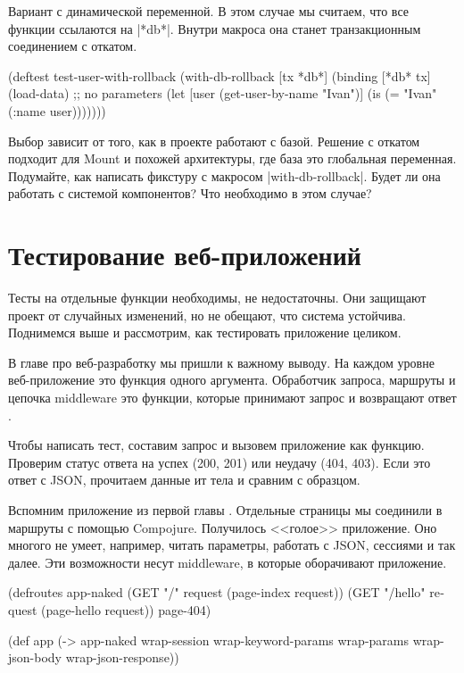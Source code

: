 
Вариант с динамической переменной. В этом случае мы считаем, что все функции
ссылаются на \spverb|*db*|. Внутри макроса она станет транзакционным соединением
с откатом.

\begin{english}
  \begin{clojure}
(deftest test-user-with-rollback
  (with-db-rollback [tx *db*]
    (binding [*db* tx]
      (load-data) ;; no parameters
      (let [user (get-user-by-name "Ivan")]
        (is (= "Ivan" (:name user)))))))
  \end{clojure}
\end{english}

Выбор зависит от того, как в проекте работают с базой. Решение с откатом
подходит для Mount и похожей архитектуры, где база это глобальная
переменная. Подумайте, как написать фикстуру с макросом
\spverb|with-db-rollback|. Будет ли она работать с системой компонентов? Что
необходимо в этом случае?

\section{Тестирование веб-приложений}


Тесты на отдельные функции необходимы, не недостаточны. Они защищают проект от
случайных изменений, но не обещают, что система устойчива. Поднимемся выше и
рассмотрим, как тестировать приложение целиком.

В главе про веб-разработку мы пришли к важному выводу. На каждом уровне
веб-приложение это функция одного аргумента. Обработчик запроса, маршруты и
цепочка middleware это функции, которые принимают запрос и возвращают
ответ .

Чтобы написать тест, составим запрос и вызовем приложение как функцию. Проверим
статус ответа на успех (200, 201) или неудачу (404, 403). Если это ответ с JSON,
прочитаем данные ит тела и сравним с образцом.

Вспомним приложение из первой главы . Отдельные страницы мы
соединили в маршруты с помощью Compojure. Получилось <<голое>> приложение. Оно
многого не умеет, например, читать параметры, работать с JSON, сессиями и так
далее. Эти возможности несут middleware, в которые оборачивают приложение.


\begin{english}
  \begin{clojure}
(defroutes app-naked
  (GET "/"      request (page-index request))
  (GET "/hello" request (page-hello request))
  page-404)

(def app
  (-> app-naked
      wrap-session
      wrap-keyword-params
      wrap-params
      wrap-json-body
      wrap-json-response))
  \end{clojure}
\end{english}

